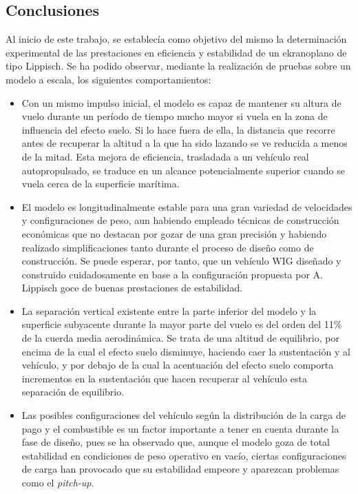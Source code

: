 \subsection{Conclusiones}
\label{sec:conclusions:conclusions}

Al inicio de este trabajo, se establecía como objetivo del mismo la determinación experimental de las prestaciones en eficiencia y estabilidad de un ekranoplano de tipo Lippisch. Se ha podido observar, mediante la realización de pruebas sobre un modelo a escala, los siguientes comportamientos:

\begin{itemize}
\item Con un mismo impulso inicial, el modelo es capaz de mantener su altura de vuelo durante un período de tiempo mucho mayor si vuela en la zona de influencia del efecto suelo. Si lo hace fuera de ella, la distancia que recorre antes de recuperar la altitud a la que ha sido lazando se ve reducida a menos de la mitad. Esta mejora de eficiencia, trasladada a un vehículo real autopropulsado, se traduce en un alcance potencialmente superior cuando se vuela cerca de la superficie marítima.
\item El modelo es longitudinalmente estable para una gran variedad de velocidades y configuraciones de peso, aun habiendo empleado técnicas de construcción económicas que no destacan por gozar de una gran precisión y habiendo realizado simplificaciones tanto durante el proceso de diseño como de construcción. Se puede esperar, por tanto, que un vehículo WIG diseñado y construido cuidadosamente en base a la configuración propuesta por A. Lippisch goce de buenas prestaciones de estabilidad.
\item La separación vertical existente entre la parte inferior del modelo y la superficie subyacente durante la mayor parte del vuelo es del orden del 11\% de la cuerda media aerodinámica. Se trata de una altitud de equilibrio, por encima de la cual el efecto suelo disminuye, haciendo caer la sustentación y al vehículo, y por debajo de la cual la acentuación del efecto suelo comporta incrementos en la sustentación que hacen recuperar al vehículo esta separación de equilibrio.
\item Las posibles configuraciones del vehículo según la distribución de la carga de pago y el combustible es un factor importante a tener en cuenta durante la fase de diseño, pues se ha observado que, aunque el modelo goza de total estabilidad en condiciones de peso operativo en vacío, ciertas configuraciones de carga han provocado que su estabilidad empeore y aparezcan problemas como el \emph{pitch-up}.
\end{itemize}

